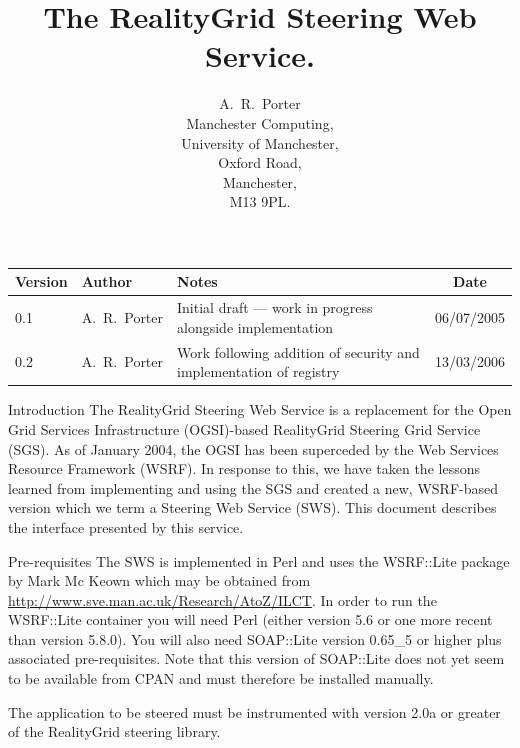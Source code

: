 \documentclass[a4paper]{article}
\begin{document}
\title{The RealityGrid Steering Web Service.}

\author{A.~R.~Porter \\
Manchester Computing,\\University of Manchester,\\Oxford Road,\\
Manchester,\\M13 9PL.}


\maketitle

\begin{table}
\begin{center}
\begin{tabular}{l|l|p{5cm}|c}
\hline\hline
Version & Author & Notes & Date \\
\hline
0.1 & A.~R.~Porter & Initial draft --- work in progress alongside implementation & 06/07/2005\\
0.2 & A.~R.~Porter & Work following addition of security and implementation of registry & 13/03/2006\\
\hline\hline
\end{tabular}
\end{center}
\end{table}

\pagebreak

\tableofcontents

\pagebreak

\begin{section}{Introduction}
The RealityGrid Steering Web Service is a replacement for the Open
Grid Services Infrastructure (OGSI)-based RealityGrid Steering Grid
Service (SGS).  As of January 2004, the OGSI has been superceded by
the Web Services Resource Framework (WSRF).  In response to this, we
have taken the lessons learned from implementing and using the SGS and
created a new, WSRF-based version which we term a Steering Web Service
(SWS).  This document describes the interface presented by this
service.
\end{section}


\begin{section}{Pre-requisites}
The SWS is implemented in Perl and uses the WSRF::Lite package by Mark
Mc Keown which may be obtained from
\url{http://www.sve.man.ac.uk/Research/AtoZ/ILCT}.  In order to run
the WSRF::Lite container you will need Perl (either version 5.6 or
one more recent than version 5.8.0).  You will also need SOAP::Lite version
0.65\_5 or higher plus associated pre-requisites.  Note that this
version of SOAP::Lite does not yet seem to be available from CPAN and
must therefore be installed manually.

The application to be steered must be instrumented with version 2.0a or
greater of the RealityGrid steering library.
\end{section}
\end{document}
